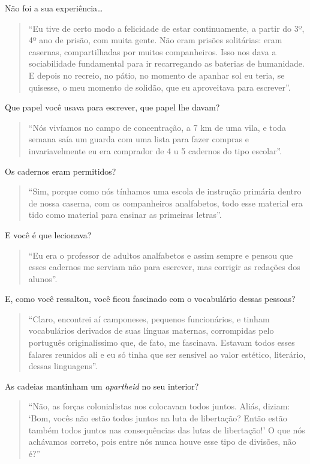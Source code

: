 \documentclass[
  letterpaper,
  DIV=11,
  numbers=noendperiod]{scrreprt}
\begin{document}
Não foi a sua experiência\ldots{}

\begin{quote}
``Eu tive de certo modo a felicidade de estar continuamente, a partir do
3º, 4º ano de prisão, com muita gente. Não eram prisões solitárias: eram
casernas, compartilhadas por muitos companheiros. Isso nos dava a
sociabilidade fundamental para ir recarregando as baterias de
humanidade. E depois no recreio, no pátio, no momento de apanhar sol eu
teria, se quisesse, o meu momento de solidão, que eu aproveitava para
escrever''.
\end{quote}

Que papel você usava para escrever, que papel lhe davam?

\begin{quote}
``Nós vivíamos no campo de concentração, a 7 km de uma vila, e toda
semana saía um guarda com uma lista para fazer compras e invariavelmente
eu era comprador de 4 u 5 cadernos do tipo escolar''.
\end{quote}

Os cadernos eram permitidos?

\begin{quote}
``Sim, porque como nós tínhamos uma escola de instrução primária dentro
de nossa caserna, com os companheiros analfabetos, todo esse material
era tido como material para ensinar as primeiras letras''.
\end{quote}

E você é que lecionava?

\begin{quote}
``Eu era o professor de adultos analfabetos e assim sempre e pensou que
esses cadernos me serviam não para escrever, mas corrigir as redações
dos alunos''.
\end{quote}

E, como você ressaltou, você ficou fascinado com o vocabulário dessas
pessoas?

\begin{quote}
``Claro, encontrei aí camponeses, pequenos funcionários, e tinham
vocabulários derivados de suas línguas maternas, corrompidas pelo
português originalíssimo que, de fato, me fascinava. Estavam todos esses
falares reunidos ali e eu só tinha que ser sensível ao valor estético,
literário, dessas linguagens''.
\end{quote}

As cadeias mantinham um \emph{apartheid} no seu interior?

\begin{quote}
``Não, as forças colonialistas nos colocavam todos juntos. Aliás,
diziam: `Bom, vocês não estão todos juntos na luta de libertação? Então
estão também todos juntos nas consequências das lutas de libertação!' O
que nós achávamos correto, pois entre nós nunca houve esse tipo de
divisões, não é?''
\end{quote}
\end{document}
